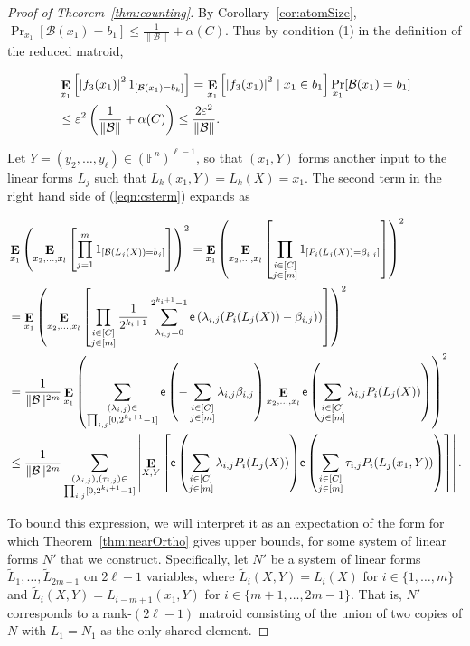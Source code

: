 \documentclass{article}
\theoremstyle{plain}
\theoremstyle{definition}
\theoremstyle{definition}
\theoremstyle{remark}
\numberwithin{equation}{section}
\newcommand{\FF}{\mathbb{F}}
\newcommand{\Esymb}{{\bf E}}
\DeclareMathOperator*{\E}{\Esymb}
\newcommand{\cB}{\mathcal B}
\newcommand{\expo}[1]{{\mathsf{e}\left(#1\right)}}
\begin{document}
\begin{proof}[Proof of Theorem~\ref{thm:counting}]
By Corollary~\ref{cor:atomSize}, $\Pr_{x_1}[\cB(x_1)=b_1]\leq \frac{1}{\|\cB\|}+\alpha(C)$. Thus by condition (1) in the definition of the reduced matroid,

\begin{align*}
    & \E_{x_1}\left[\left|f_{3}(x_1)\right|^2 1_{[\cB(x_1)=b_k]}\right]=\E_{x_1}\left[\left|f_{3}(x_1)\right|^2 \mid x_1\in b_1\right] \Pr_{x_1}[\cB(x_1)=b_1] \\
    & \leq \varepsilon^2 \left(\frac{1}{\|\cB\|}+\alpha(C)\right) \leq \frac{2\varepsilon^2}{\|\cB\|}.
\end{align*}

Let $Y=(y_2,\dots,y_\ell)\in(\FF^n)^{\ell-1}$, so that $(x_1,Y)$ forms another input to the linear forms $L_j$ such that $L_k(x_1,Y)=L_k(X)=x_1$. The second term in the right hand side of (\ref{eqn:csterm}) expands as

\begin{align*}
    & \E_{x_1}\left(\E_{x_2,\dots,x_l}\left[ \prod_{j=1}^m 1_{[\cB(L_j(X))=b_j]}\right]\right)^2
    = \E_{x_1}\left(\E_{x_2,\dots,x_l}\left[ \prod_{\substack{i\in [C]\\ j\in [m]}} 1_{[P_i(L_j(X))=\beta_{i,j}]}\right]\right)^2 \\
    & = \E_{x_1}\left(\E_{x_2,\dots,x_l}\left[ \prod_{\substack{i\in [C]\\ j\in [m]}} \frac{1}{2^{k_i+1}}\sum_{\lambda_{i,j}=0}^{2^{k_i+1}-1}\expo{\lambda_{i,j}(P_i(L_j(X))-\beta_{i,j})}\right]\right)^2 \\
    & = \frac{1}{\|\cB\|^{2m}}\E_{x_1}\left(\sum_{\substack{(\lambda_{i,j})\in\\ \prod_{i,j}[0,2^{k_i+1}-1]}}\expo{-\sum_{\substack{i\in [C]\\ j\in [m]}}\lambda_{i,j}\beta_{i,j}}\E_{x_2,\dots,x_l} \expo{\sum_{\substack{i\in[C]\\ j\in[m]}} \lambda_{i,j}P_i(L_j(X))}\right)^2 \\
    & \leq \frac{1}{\|\cB\|^{2m}}\sum_{\substack{(\lambda_{i,j}),(\tau_{i,j})\in\\ \prod_{i,j}[0,2^{k_i+1}-1]}}\left |\E_{\substack{X,Y}}\left[\expo{\sum_{\substack{i\in[C]\\ j\in[m]}} \lambda_{i,j}P_i(L_j(X))}\expo{\sum_{\substack{i\in[C]\\ j\in[m]}} \tau_{i,j}P_i(L_j(x_1,Y))}\right]\right|.
\end{align*}

To bound this expression, we will interpret it as an expectation of the form for which Theorem~\ref{thm:nearOrtho} gives upper bounds, for some system of linear forms $N'$ that we construct. Specifically, let $N'$ be a system of linear forms $\tilde L_1,\dots,\tilde L_{2m-1}$ on $2\ell-1$ variables, where $\tilde L_i(X,Y)=L_i(X)$ for $i\in\{1,\dots,m\}$ and $\tilde L_i(X,Y)=L_{i-m+1}(x_1,Y)$ for $i\in\{m+1,\dots,2m-1\}$. That is, $N'$ corresponds to a rank-$(2\ell-1)$ matroid consisting of the union of two copies of $N$ with $L_1=N_1$ as the only shared element.


\end{proof}
\end{document}
